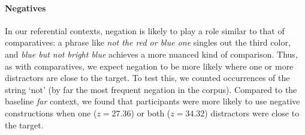 \documentclass[11pt,letterpaper]{article}
\newcommand{\word}{\textit}
\renewcommand{\|}{\mid}
\newcommand{\cond}{\emph}
\begin{document}
\paragraph{Negatives}
In our referential contexts, negation is likely to play a role similar
to that of comparatives: a phrase like \word{not the red or blue one}
singles out the third color, and \word{blue but not bright blue}
achieves a more nuanced kind of comparison. Thus, as with
comparatives, we expect negation to be more likely where one or more
distractors are close to the target. To test this, we counted
occurrences of the string `not' (by far the most frequent negation in
the corpus). Compared to the baseline \cond{far} context, we found that participants were more likely to use negative constructions when one ($z = 27.36$) or both ($z = 34.32$) distractors were close to the target.

\newcommand{\Lex}{\mathcal{L}}
\newcommand{\Costs}{\kappa}
\newcommand{\Messages}{U}
\newcommand{\targetPrior}{P}
\end{document}
